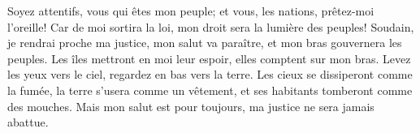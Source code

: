 Soyez attentifs, vous qui êtes mon peuple;
	et vous, les nations, prêtez-moi l’oreille!
	Car de moi sortira la loi, mon droit sera la lumière des peuples!
Soudain, je rendrai proche ma justice,
	mon salut va paraître, et mon bras gouvernera les peuples.
	Les îles mettront en moi leur espoir, elles comptent sur mon bras.
Levez les yeux vers le ciel, regardez en bas vers la terre.
	Les cieux se dissiperont comme la fumée,
	la terre s’usera comme un vêtement,
	et ses habitants tomberont comme des mouches.
Mais mon salut est pour toujours,
	ma justice ne sera jamais abattue.
